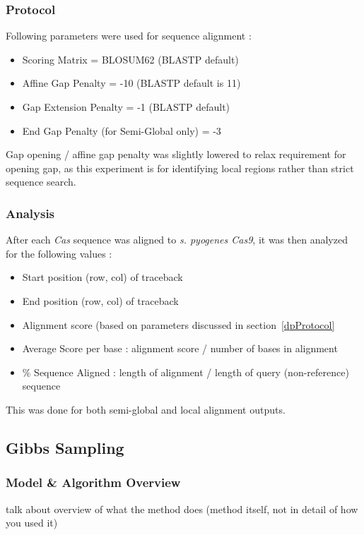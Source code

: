 \documentclass[11pt, oneside]{article}
\begin{document}
\medskip
\subsubsection{Protocol} 
Following parameters were used for sequence alignment :
\begin{itemize}
\item Scoring Matrix = BLOSUM62 (BLASTP default)
\item Affine Gap Penalty = -10 (BLASTP default is 11)
\item Gap Extension Penalty = -1 (BLASTP default)
\item End Gap Penalty (for Semi-Global only) = -3
\end{itemize}

Gap opening / affine gap penalty was slightly lowered to relax requirement for opening gap, as this experiment is for identifying local regions rather than strict sequence search.

\medskip
\subsubsection{Analysis}

After each \textit{Cas} sequence was aligned to \textit{s. pyogenes Cas9}, it was then analyzed for the following values :
\begin{itemize}
\item Start position (row, col) of traceback
\item End position (row, col) of traceback
\item Alignment score (based on parameters discussed in section~\ref{dpProtocol}
\item Average Score per base : alignment score / number of bases in alignment
\item \% Sequence Aligned : length of alignment / length of query (non-reference) sequence
\end{itemize}

This was done for both semi-global and local alignment outputs. 

\bigskip
\subsection{Gibbs Sampling}
\medskip
\subsubsection{Model \& Algorithm Overview}
talk about overview of what the method does (method itself, not in detail of how you used it)
\end{document}

